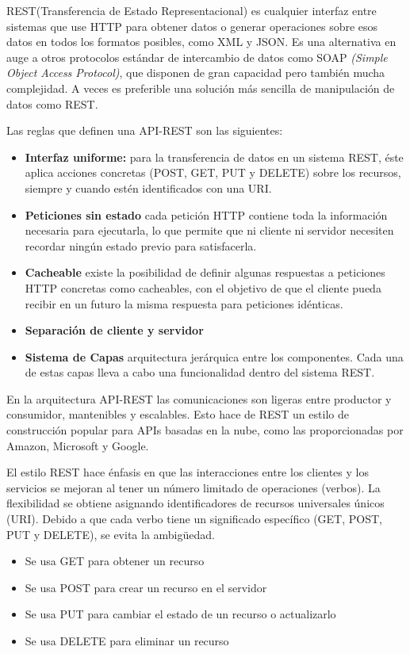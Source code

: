 REST(Transferencia de Estado Representacional) es cualquier interfaz entre sistemas que use HTTP para obtener datos o generar operaciones sobre esos datos en todos los formatos posibles, como XML y JSON. Es una alternativa en auge a otros protocolos estándar de intercambio de datos como SOAP \textit{(Simple Object Access Protocol)}, que disponen de gran capacidad pero también mucha complejidad. A veces es preferible una solución más sencilla de manipulación de datos como REST.

Las reglas que definen una API-REST son las siguientes:
\begin{itemize}
    \item \textbf {Interfaz uniforme: } para la transferencia de datos en un sistema REST, éste aplica acciones concretas (POST, GET, PUT y DELETE) sobre los recursos, siempre y cuando estén identificados con una URI.
    \item \textbf {Peticiones sin estado} cada petición HTTP contiene toda la información necesaria para ejecutarla, lo que permite que ni cliente ni servidor necesiten recordar ningún estado previo para satisfacerla.
    \item \textbf {Cacheable} existe la posibilidad de definir algunas respuestas a peticiones HTTP concretas como cacheables, con el objetivo de que el cliente pueda recibir en un futuro la misma respuesta para peticiones idénticas.
    \item \textbf {Separación de cliente y servidor}
    \item \textbf {Sistema de Capas} arquitectura jerárquica entre los componentes. Cada una de estas capas lleva a cabo una funcionalidad dentro del sistema REST.
\end{itemize}

En la arquitectura API-REST las comunicaciones son ligeras entre productor y consumidor, mantenibles y escalables. Esto hace de REST un estilo de construcción popular para APIs basadas en la nube, como las proporcionadas por Amazon, Microsoft y Google.

El estilo REST hace énfasis en que las interacciones entre los clientes y los servicios se mejoran al tener un número limitado de operaciones (verbos). La flexibilidad se obtiene asignando identificadores de recursos universales únicos (URI). Debido a que cada verbo tiene un significado específico (GET, POST, PUT y DELETE), se evita la ambigüedad.
\begin{itemize}
    \item Se usa GET para obtener un recurso
    \item Se usa POST para crear un recurso en el servidor
    \item Se usa PUT para cambiar el estado de un recurso o actualizarlo
    \item Se usa DELETE para eliminar un recurso
\end{itemize}

